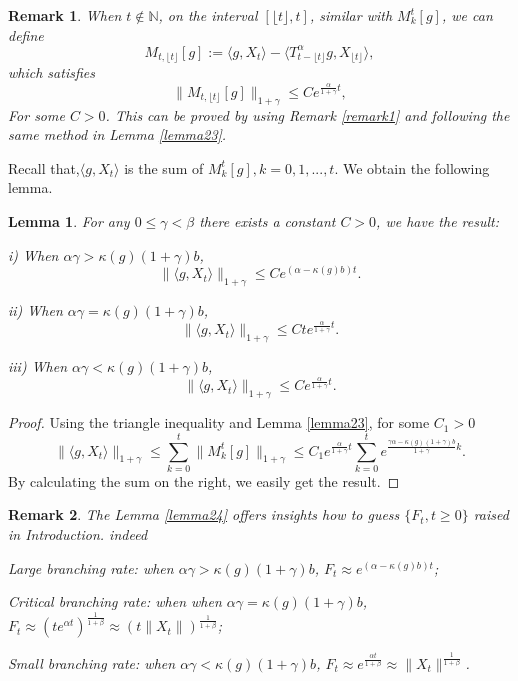 \documentclass{article}
\newtheorem{remark}{Remark}[section]
\newtheorem{lemma}{Lemma}[section]
\begin{document}
\begin{remark}\label{remark2}
   When $t\notin \mathbb{N}$, on the interval $[\lfloor t \rfloor , t]$, similar with $M_k^t[g]$, we can define 
   $$M_{t,\lfloor t \rfloor}[g]:=\langle g,X_t\rangle-\langle T^{\alpha}_{t-\lfloor t \rfloor}g,X_{\lfloor t \rfloor}\rangle,$$
   which satisfies 
   $$\|M_{t,\lfloor t \rfloor}[g]\|_{1+\gamma}\leq C e^{\frac{\alpha}{1+\gamma}t},$$
   For some $C>0$. This can be proved by using Remark \ref{remark1} and following the same method in Lemma \ref{lemma23}.
\end{remark}

Recall that,$\langle g,X_t\rangle$ is the sum of $M_k^{t}[g], k=0,1,...,t$. We obtain the following lemma. 

\begin{lemma}\label{lemma24}
For any $0\leq \gamma < \beta$ there exists a constant $C>0$, we have the result:

i) When $\alpha\gamma > \kappa(g)(1+\gamma)b$,
$$\|\langle g,X_t\rangle\|_{1+\gamma}\leq C e^{(\alpha-\kappa(g)b)t}.$$

ii) When  $\alpha\gamma = \kappa(g)(1+\gamma)b$,
$$\|\langle g,X_t\rangle\|_{1+\gamma}\leq C te^{\frac{\alpha}{1+\gamma}t}.$$

iii) When $\alpha\gamma < \kappa(g)(1+\gamma)b$,
$$\|\langle g,X_t\rangle\|_{1+\gamma}\leq C e^{\frac{\alpha}{1+\gamma}t}.$$

\end{lemma}
\begin{proof}
Using the triangle inequality and Lemma \eqref{lemma23}, for some $C_1>0$
$$\|\langle g,X_t\rangle\|_{1+\gamma}\leq \sum_{k=0}^{t}\|M_k^t[g]\|_{1+\gamma}\leq C_1 e^{\frac{\alpha}{1+\gamma}t}\sum_{k=0}^t e^{\frac{\gamma\alpha-\kappa(g)(1+\gamma)b}{1+\gamma}k}.$$
By calculating the sum on the right, we easily get the result. 
\end{proof} 

\begin{remark}
    The Lemma \eqref{lemma24} offers insights how to guess $\{F_t, t\geq0\}$ raised in Introduction. indeed
    
    Large branching rate: when $\alpha\gamma > \kappa(g)(1+\gamma)b$, $F_t\approx e^{(\alpha-\kappa(g)b)t} $; 
    
    Critical branching rate: when when  $\alpha\gamma = \kappa(g)(1+\gamma)b$, $F_t\approx (te^{\alpha t})^{\frac{1}{1+\beta}}\approx(t\|X_t\|)^{\frac{1}{1+\beta}}$;
    
    
    Small branching rate: when $\alpha\gamma < \kappa(g)(1+\gamma)b$, $F_t\approx e^{\frac{\alpha t}{1+\beta}}\approx \|X_t\|^{\frac{1}{1+\beta}}$.
\end{remark}
\end{document}
